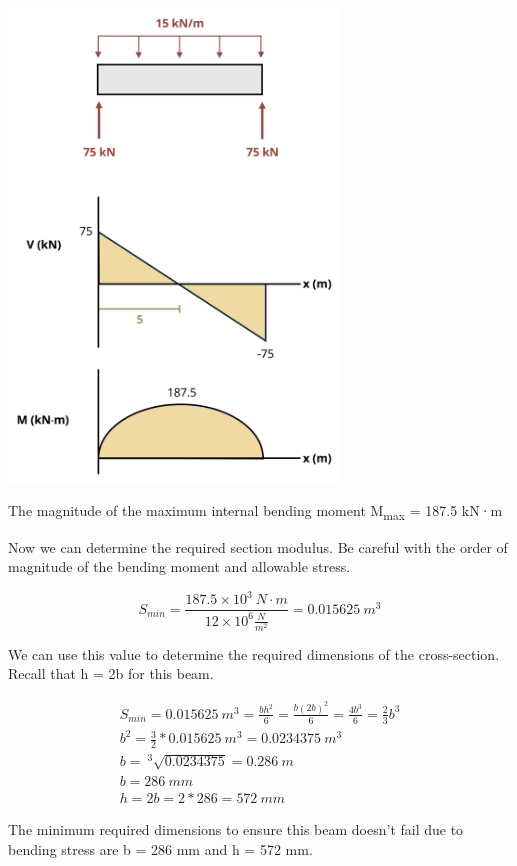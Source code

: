 \documentclass[
  letterpaper,
  DIV=11,
  numbers=noendperiod]{scrreprt}
\theoremstyle{definition}
\theoremstyle{remark}
\begin{document}
\begin{tcolorbox}
\begin{tcolorbox}
\begin{center}
\includegraphics[width=3.45833in,height=\textheight]{images/CH9 PNGs/Example 9.4 part 2.png}
\end{center}

The magnitude of the maximum internal bending moment
\textbar M\textsubscript{max}\textbar{} = 187.5 kN·m

Now we can determine the required section modulus. Be careful with the
order of magnitude of the bending moment and allowable stress.

\[
S_{min}=\frac{187.5\times10^3{~N}\cdot{m}}{12\times10^6\frac{N}{m^2}}=0.015625{~m}^3
\]

We can use this value to determine the required dimensions of the
cross-section. Recall that h = 2b for this beam.

\[
\begin{gathered}
S_{min}=0.015625{~m^3}=\frac{b h^2}{6}=\frac{b(2 b)^2}{6}=\frac{4 b^3}{6}=\frac{2}{3} b^3 \\
b^2=\frac{3}{2} * 0.015625{~m^3}=0.0234375{~m^3} \\
b=~^3\sqrt{0.0234375}=0.286{~m} \\
b=286{~mm} \\
h=2b=2 * 286=572{~mm}
\end{gathered}
\]

The minimum required dimensions to ensure this beam doesn't fail due to
bending stress are b = 286 mm and h = 572 mm.

\end{tcolorbox}

\end{tcolorbox}
\end{document}
